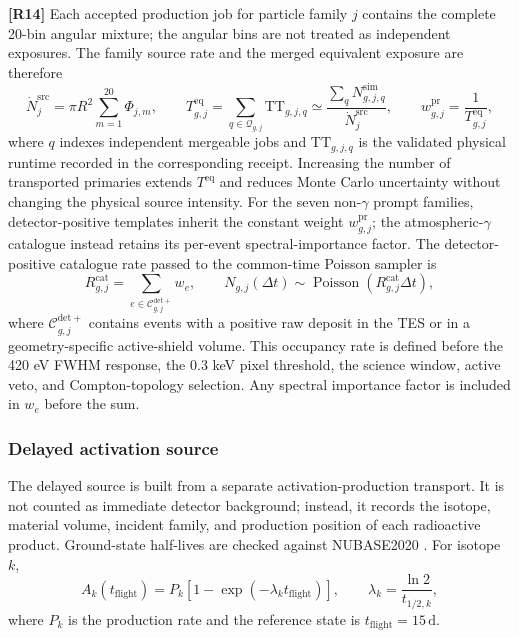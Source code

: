 \documentclass[11pt]{article}
\newcommand{\revblue}[1]{\textcolor{revisionblue}{#1}}
\begin{document}
\begingroup
\color{revisionblue}
\noindent\textbf{[R14]} Each accepted production job for particle family $j$
contains the complete 20-bin angular mixture; the angular bins are not treated
as independent exposures. The family source rate and the merged equivalent
exposure are therefore
\begin{equation}
 \dot N^{\mathrm{src}}_{j}=\pi R^2\sum_{m=1}^{20}\Phi_{j,m},
 \qquad
 T^{\mathrm{eq}}_{g,j}=\sum_{q\in\mathcal Q_{g,j}}\mathrm{TT}_{g,j,q}
 \simeq
 \frac{\sum_q N^{\mathrm{sim}}_{g,j,q}}{\dot N^{\mathrm{src}}_{j}},
 \qquad
 w^{\mathrm{pr}}_{g,j}=\frac{1}{T^{\mathrm{eq}}_{g,j}},
 \label{eq:prompt_equivalent_exposure}
\end{equation}
where $q$ indexes independent mergeable jobs and $\mathrm{TT}_{g,j,q}$ is the
validated physical runtime recorded in the corresponding receipt. Increasing
the number of transported primaries extends $T^{\mathrm{eq}}$ and reduces Monte
Carlo uncertainty without changing the physical source intensity. For the
seven non-$\gamma$ prompt families, detector-positive templates inherit the
constant weight $w^{\mathrm{pr}}_{g,j}$; the \revblue{atmospheric-$\gamma$ catalogue} instead
retains its per-event spectral-importance factor. The detector-positive
catalogue rate passed to the common-time Poisson sampler is
\begin{equation}
 R^{\mathrm{cat}}_{g,j}=\sum_{e\in\mathcal C^{\mathrm{det+}}_{g,j}}w_e,
 \qquad
 N_{g,j}(\Delta t)\sim
 \operatorname{Poisson}\!\left(R^{\mathrm{cat}}_{g,j}\Delta t\right),
 \label{eq:catalog_poisson_rate}
\end{equation}
where $\mathcal C^{\mathrm{det+}}_{g,j}$ contains events with a positive raw
deposit in the TES or in a geometry-specific active-shield volume. This occupancy rate is
defined before the 420 eV FWHM response, the 0.3 keV pixel threshold, the
science window, active veto, and Compton-topology selection. Any spectral
importance factor is included in $w_e$ before the sum.
\endgroup

\subsubsection{Delayed activation source}
\label{subsec:delayed_source}

The delayed source is built from a separate activation-production transport. It
is not counted as immediate detector background; instead, it records the isotope,
material volume, incident family, and production position of each radioactive
product. Ground-state half-lives are checked against NUBASE2020
\cite{Kondev2021NUBASE}. For isotope $k$,
\begin{equation}
  A_k(t_{\mathrm{flight}})=P_k\left[1-\exp(-\lambda_k t_{\mathrm{flight}})\right],
  \qquad \lambda_k=\frac{\ln2}{t_{1/2,k}},
\end{equation}
where $P_k$ is the production rate and the reference state is
$t_{\mathrm{flight}}=15\,\mathrm{d}$.
\end{document}
